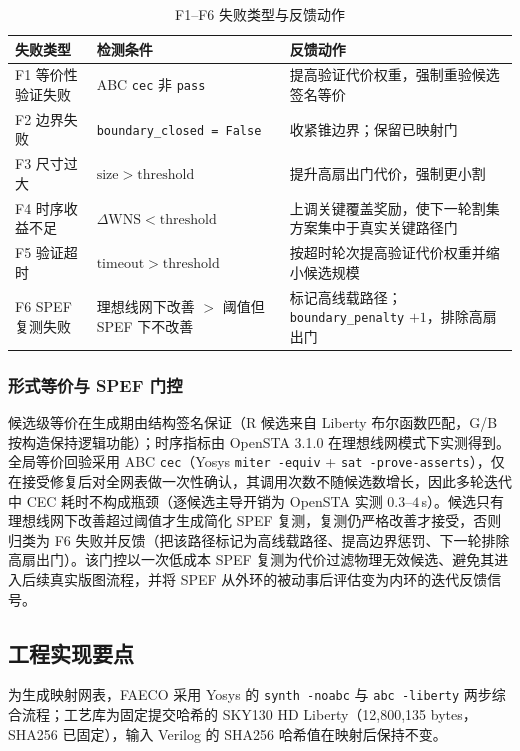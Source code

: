 \documentclass[journal]{IEEEtran}
\begin{document}
\begin{table}[!t]
\centering
\caption{F1--F6 失败类型与反馈动作}
\label{tab:failures}
\scriptsize
\setlength{\tabcolsep}{2pt}
\begin{tabular}{p{2.0cm}p{3.2cm}p{2.9cm}}
\toprule
\textbf{失败类型} & \textbf{检测条件} & \textbf{反馈动作} \\
\midrule
F1 等价性验证失败 & ABC \texttt{cec} 非 \texttt{pass} & 提高验证代价权重，强制重验候选签名等价 \\
F2 边界失败 & \texttt{boundary\_closed = False} & 收紧锥边界；保留已映射门 \\
F3 尺寸过大 & $\mathrm{size} > \mathrm{threshold}$ & 提升高扇出门代价，强制更小割 \\
F4 时序收益不足 & $\Delta\mathrm{WNS} < \mathrm{threshold}$ & 上调关键覆盖奖励，使下一轮割集方案集中于真实关键路径门 \\
F5 验证超时 & $\mathrm{timeout} > \mathrm{threshold}$ & 按超时轮次提高验证代价权重并缩小候选规模 \\
F6 SPEF 复测失败 & 理想线网下改善 $>$ 阈值但 SPEF 下不改善 & 标记高线载路径；\texttt{boundary\_penalty} $+1$，排除高扇出门 \\
\bottomrule
\end{tabular}
\end{table}

\subsubsection{形式等价与 SPEF 门控}
候选级等价在生成期由结构签名保证（R 候选来自 Liberty 布尔函数匹配，G/B 按构造保持逻辑功能）；时序指标由 OpenSTA 3.1.0 在理想线网模式下实测得到。全局等价回验采用 ABC \texttt{cec}（Yosys \texttt{miter -equiv} + \texttt{sat -prove-asserts}），仅在接受修复后对全网表做一次性确认，其调用次数不随候选数增长，因此多轮迭代中 CEC 耗时不构成瓶颈（逐候选主导开销为 OpenSTA 实测 $0.3$--$4\,$s）。候选只有理想线网下改善超过阈值才生成简化 SPEF 复测，复测仍严格改善才接受，否则归类为 F6 失败并反馈（把该路径标记为高线载路径、提高边界惩罚、下一轮排除高扇出门）。该门控以一次低成本 SPEF 复测为代价过滤物理无效候选、避免其进入后续真实版图流程，并将 SPEF 从外环的被动事后评估变为内环的迭代反馈信号。

\subsection{工程实现要点}\label{sec:impl}

为生成映射网表，FAECO 采用 Yosys 的 \texttt{synth -noabc} 与 \texttt{abc -liberty} 两步综合流程；工艺库为固定提交哈希的 SKY130 HD Liberty（12,800,135 bytes，SHA256 已固定），输入 Verilog 的 SHA256 哈希值在映射后保持不变。
\end{document}
